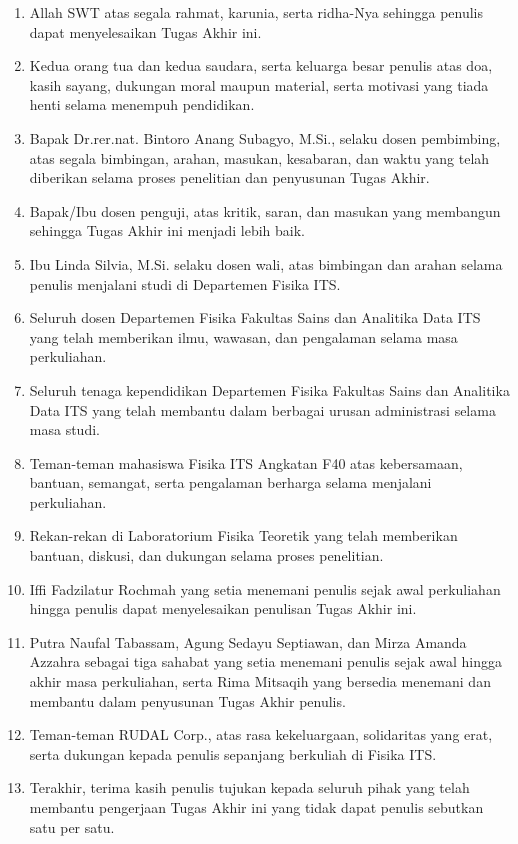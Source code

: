 \begin{enumerate}
    \item Allah SWT atas segala rahmat, karunia, serta ridha-Nya sehingga penulis dapat menyelesaikan Tugas Akhir ini.

    \item Kedua orang tua dan kedua saudara, serta keluarga besar penulis atas doa, kasih sayang, dukungan moral maupun material, serta motivasi yang tiada henti selama menempuh pendidikan.

    \item Bapak Dr.rer.nat. Bintoro Anang Subagyo, M.Si., selaku dosen pembimbing, atas segala bimbingan, arahan, masukan, kesabaran, dan waktu yang telah diberikan selama proses penelitian dan penyusunan Tugas Akhir.

    \item Bapak/Ibu dosen penguji, atas kritik, saran, dan masukan yang membangun sehingga Tugas Akhir ini menjadi lebih baik.

    \item Ibu Linda Silvia, M.Si. selaku dosen wali, atas bimbingan dan arahan selama penulis menjalani studi di Departemen Fisika ITS.

    \item Seluruh dosen Departemen Fisika Fakultas Sains dan Analitika Data ITS yang telah memberikan ilmu, wawasan, dan pengalaman selama masa perkuliahan.

    \item Seluruh tenaga kependidikan Departemen Fisika Fakultas Sains dan Analitika Data ITS yang telah membantu dalam berbagai urusan administrasi selama masa studi.

    \item Teman-teman mahasiswa Fisika ITS Angkatan F40 atas kebersamaan, bantuan, semangat, serta pengalaman berharga selama menjalani perkuliahan.

    \item Rekan-rekan di Laboratorium Fisika Teoretik yang telah memberikan bantuan, diskusi, dan dukungan selama proses penelitian.

    \item Iffi Fadzilatur Rochmah yang setia menemani penulis sejak awal perkuliahan hingga penulis dapat menyelesaikan penulisan Tugas Akhir ini.

    \item Putra Naufal Tabassam, Agung Sedayu Septiawan, dan Mirza Amanda Azzahra sebagai tiga sahabat yang setia menemani penulis sejak awal hingga akhir masa perkuliahan, serta Rima Mitsaqih yang bersedia menemani dan membantu dalam penyusunan Tugas Akhir penulis.

    \item Teman-teman RUDAL Corp., atas rasa kekeluargaan, solidaritas yang erat, serta dukungan kepada penulis sepanjang berkuliah di Fisika ITS.

    \item Terakhir, terima kasih penulis tujukan kepada seluruh pihak yang telah membantu pengerjaan Tugas Akhir ini yang tidak dapat penulis sebutkan satu per satu.

\end{enumerate}



